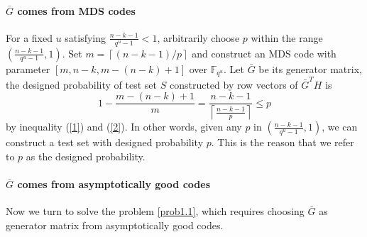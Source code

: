 \documentclass[a4paper, 10pt]{article}
\begin{document}

\paragraph{$\bar{G}$ comes from MDS codes}
For a fixed $u$ satisfying $\frac{n-k-1}{q^u-1}< 1$, arbitrarily choose $p$ within the range $\left(\frac{n-k-1}{q^u-1}, 1\right)$.
 Set $m=\left \lceil (n-k-1)/p \right \rceil $ and construct an MDS code with parameter $[m,n-k,m-(n-k)+1]$ over $\mathbb{F}_{q^u}$. Let $\bar{G}$ be its generator matrix, the designed probability of test set $S$ constructed by row vectors of $\bar{G}^TH$ is 
\[
1-\frac{m-(n-k)+1}{m}=\frac{n-k-1}{\left \lceil \frac{n-k-1}{p}  \right \rceil }\le p
\]
by inequality (\ref{1}) and (\ref{2}). In other words, given any $p$ in $\left(\frac{n-k-1}{q^u-1}, 1\right)$, we can construct a test set with designed probability $p$. This is the reason that we refer to $p$ as the designed probability.

\paragraph{$\bar{G}$ comes from asymptotically good codes}
Now we turn to solve the problem \ref{prob1.1}, which requires choosing $\bar{G}$ as generator matrix from asymptotically good codes.
\end{document}
